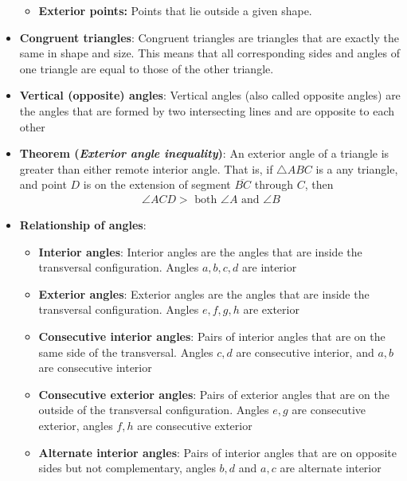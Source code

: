 \documentclass{report}
\begin{document}
\begin{itemize}
\begin{itemize}
                \item \textbf{Exterior points:} Points that lie outside a given shape.
            \end{itemize}
        \item \textbf{Congruent triangles}: Congruent triangles are triangles that are exactly the same in shape and size. This means that all corresponding sides and angles of one triangle are equal to those of the other triangle.
        \item \textbf{Vertical (opposite) angles}: Vertical angles (also called opposite angles) are the angles that are formed by two intersecting lines and are opposite to each other
        \item \textbf{Theorem (\textit{Exterior angle inequality})}: An exterior angle of a triangle is greater than either remote interior angle. That is, if $\triangle ABC$ is a any triangle, and point $D$ is on the extension of segment $\overline{BC}$ through $C$, then
            \begin{align*}
                \angle ACD > \text{ both } \angle A \text{ and } \angle B
            \end{align*}
        \item \textbf{Relationship of angles}:
            \bigbreak \noindent 
            \begin{figure}[ht]
                \centering
                \label{fig:tc}
            \end{figure}
            \bigbreak \noindent 
            \begin{itemize}
                \item \textbf{Interior angles}: Interior angles are the angles that are inside the transversal configuration. Angles $a,b,c,d$ are interior
                \item \textbf{Exterior angles}: Exterior angles are the angles that are inside the transversal configuration. Angles $e,f,g,h$ are exterior
                \item \textbf{Consecutive interior angles}: Pairs of interior angles that are on the same side of the transversal. Angles $c,d$ are consecutive interior, and $a,b$ are consecutive interior
                \item \textbf{Consecutive exterior angles}: Pairs of exterior angles that are on the outside of the transversal configuration. Angles $e,g$ are consecutive exterior, angles $f,h$ are consecutive exterior
                \item \textbf{Alternate interior angles}: Pairs of interior angles that are on opposite sides but not complementary, angles $b,d$ and $a,c$ are alternate interior

\end{itemize}
\end{itemize}
\end{document}
